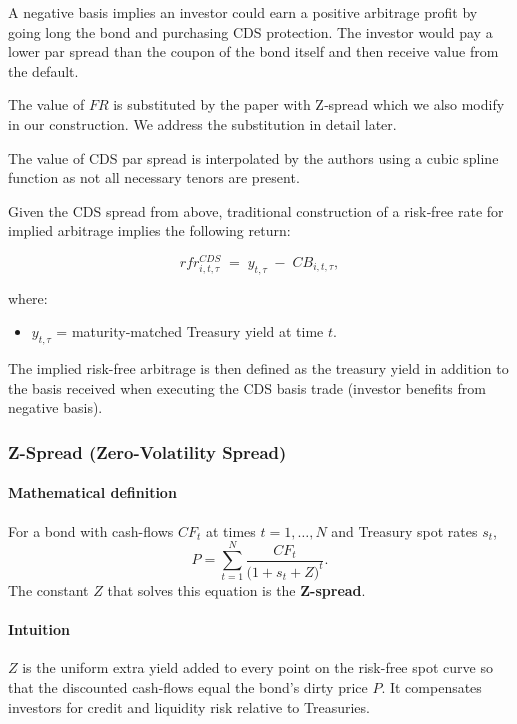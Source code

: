 \documentclass{article}
\begin{document}
\begin{appendices}
A negative basis implies an investor could earn a positive arbitrage profit by going long the bond and purchasing CDS protection. 
The investor would pay a lower par spread than the coupon of the bond itself and then receive value from the default.

The value of $FR$ is substituted by the paper with Z‐spread which we also modify in our construction. We address the substitution in detail later.

The value of CDS par spread is interpolated by the authors using a cubic spline function as
not all necessary tenors are present.

Given the CDS spread from above, traditional construction of a risk‐free rate for implied arbitrage implies the following return:

\begin{equation}
  rfr^{CDS}_{i,t,\tau} \;=\; y_{t,\tau} \;-\; CB_{i,t,\tau},
\end{equation}

where:
\begin{itemize}
  \item $y_{t,\tau}$ = maturity‐matched Treasury yield at time $t$.
\end{itemize}

The implied risk-free arbitrage is then defined as the treasury yield in addition to the basis received when executing the CDS basis trade (investor benefits from negative basis).

\subsubsection{Z-Spread (Zero-Volatility Spread)}

\paragraph*{Mathematical definition}
For a bond with cash-flows $CF_t$ at times $t=1,\dots,N$ and Treasury spot rates $s_t$,
\begin{equation*}
P = \sum_{t=1}^{N} \frac{CF_t}{\bigl(1+s_t+Z\bigr)^t}.
\end{equation*}
The constant $Z$ that solves this equation is the \textbf{Z-spread}.

\paragraph*{Intuition}
$Z$ is the uniform extra yield added to every point on the risk-free spot curve so that the discounted cash-flows equal the bond's dirty price $P$. It compensates investors for credit and liquidity risk relative to Treasuries.


\end{appendices}
\end{document}
